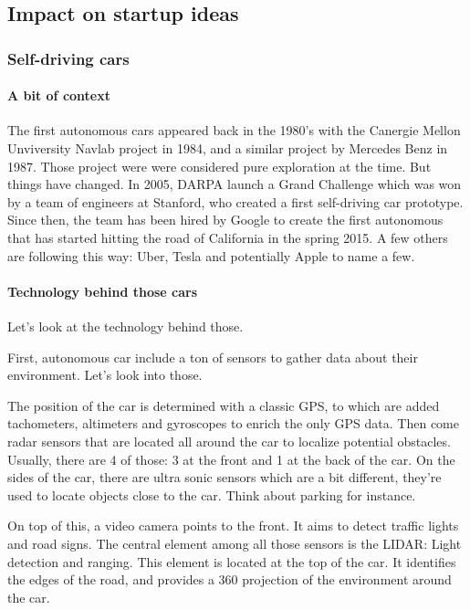 \documentclass[12pt]{article}
\begin{document}
\subsection{Impact on startup ideas}

\subsubsection{Self-driving cars}

\paragraph{A bit of context}

The first autonomous cars appeared back in the 1980's with the Canergie Mellon
Unviversity Navlab project in 1984, and a similar project by Mercedes Benz in
1987. Those project were were considered pure exploration at the time.
But things have changed. In 2005, DARPA launch a Grand Challenge which was won
by a team of engineers at Stanford, who created a first self-driving car
prototype. Since then, the team has been hired by Google to create the first
autonomous that has started hitting the road of California in the spring 2015.
A few others are following this way: Uber, Tesla and potentially Apple to name
a few.

\paragraph{Technology behind those cars}

Let's look at the technology behind those.

First, autonomous car include a ton of sensors to gather data about their
environment. Let's look into those.

The position of the car is determined with a classic GPS, to which are added
tachometers, altimeters and gyroscopes to enrich the only GPS data. Then come
radar sensors that are located all around the car to localize potential
obstacles. Usually, there are 4 of those: 3 at the front and 1 at the back of
the car. On the sides of the car, there are ultra sonic sensors which are a bit
different, they're used to locate objects close to the car. Think about parking
for instance.

\noindent On top of this, a video camera points to the front. It aims to detect
traffic lights and road signs. The central element among all those sensors is
the LIDAR: Light detection and ranging. This element is located at the top of
the car. It identifies the edges of the road, and provides a 360 projection of
the environment around the car.
\end{document}
